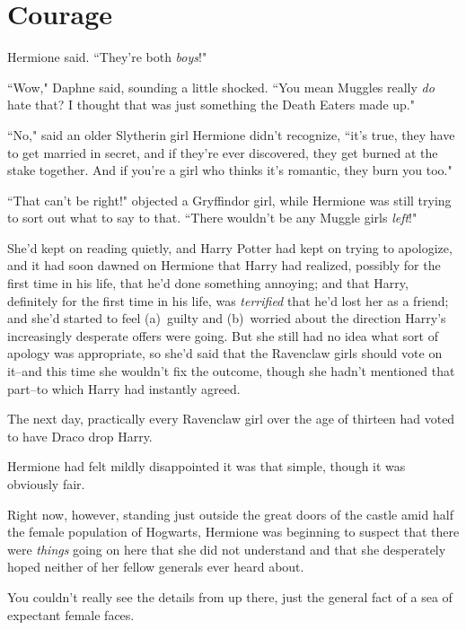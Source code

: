 \chapter{Courage}

 Hermione said. ``They're both \emph{boys}!"

\hplettrineextrapara
``Wow," Daphne said, sounding a little shocked. ``You mean Muggles really \emph{do} hate that? I thought that was just something the Death Eaters made up."

``No," said an older Slytherin girl Hermione didn't recognize, ``it's true, they have to get married in secret, and if they're ever discovered, they get burned at the stake together. And if you're a girl who thinks it's romantic, they burn you too."

``That can't be right!" objected a Gryffindor girl, while Hermione was still trying to sort out what to say to that. ``There wouldn't be any Muggle girls \emph{left}!"

She'd kept on reading quietly, and Harry Potter had kept on trying to apologize, and it had soon dawned on Hermione that Harry had realized, possibly for the first time in his life, that he'd done something annoying; and that Harry, definitely for the first time in his life, was \emph{terrified} that he'd lost her as a friend; and she'd started to feel (a)~guilty and (b)~worried about the direction Harry's increasingly desperate offers were going. But she still had no idea what sort of apology was appropriate, so she'd said that the Ravenclaw girls should vote on it\---and this time she wouldn't fix the outcome, though she hadn't mentioned that part\---to which Harry had instantly agreed.

The next day, practically every Ravenclaw girl over the age of thirteen had voted to have Draco drop Harry.

Hermione had felt mildly disappointed it was that simple, though it was obviously fair.

Right now, however, standing just outside the great doors of the castle amid half the female population of Hogwarts, Hermione was beginning to suspect that there were \emph{things} going on here that she did not understand and that she desperately hoped neither of her fellow generals ever heard about.

\later

You couldn't really see the details from up there, just the general fact of a sea of expectant female faces.

